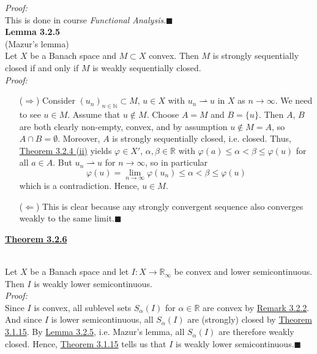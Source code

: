 \textit{Proof:}\\
This is done in course \textit{Functional Analysis}.\hfill$\blacksquare$\\[11pt]

\hypertarget{lemma_3_2_5}{\textbf{Lemma 3.2.5}}\\
(Mazur's lemma)\\
Let $X$ be a Banach space and $M\subset X$ convex. Then $M$ is strongly sequentially closed if and only if $M$ is weakly sequentially closed.\\

\textit{Proof:}
\begin{itemize}
	\item[($\Rightarrow$)] Consider $(u_n)_{n\in\mathbb{N}}\subset M$, $u\in X$ with $u_n\rightharpoonup u$ in $X$ as $n\to\infty$. We need to see $u\in M$. Assume that $u\notin M$. Choose $A=M$ and $B=\{u\}$. Then $A$, $B$ are both clearly non-empty, convex, and by assumption $u\notin M=A$, so $A\cap B=\emptyset$. Moreover, $A$ is strongly sequentially closed, i.e. closed. Thus, \hyperlink{theorem_3_2_4}{Theorem 3.2.4 (ii)} yields $\varphi\in X'$, $\alpha,\beta\in\mathbb{R}$ with $\varphi(a)\leq\alpha<\beta\leq\varphi(u)$ for all $a\in A$. But $u_n\rightharpoonup u$ for $n\to\infty$, so in particular
	\[\varphi(u)=\lim_{n\to\infty}{\varphi(u_n)}\leq\alpha<\beta\leq\varphi(u)\]
	which is a contradiction. Hence, $u\in M$.
	\item[($\Leftarrow$)] This is clear because any strongly convergent sequence also converges weakly to the same limit.\hfill$\blacksquare$\\[11pt]
\end{itemize}

\hypertarget{theorem_3_2_6}{\textbf{\underline{Theorem 3.2.6}}}\\
Let $X$ be a Banach space and let $I:X\longrightarrow\mathbb{R}_\infty$ be convex and lower semicontinuous. Then $I$ is weakly lower semicontinuous.\\

\textit{Proof:}\\
Since $I$ is convex, all sublevel sets $S_\alpha(I)$ for $\alpha\in\mathbb{R}$ are convex by \hyperlink{remark_3_2_2}{Remark 3.2.2}. And since $I$ is lower semicontinuous, all $S_\alpha(I)$ are (strongly) closed by \hyperlink{theorem_3_1_15}{Theorem 3.1.15}. By \hyperlink{lemma_3_2_5}{Lemma 3.2.5}, i.e. Mazur's lemma, all $S_\alpha(I)$ are therefore weakly closed. Hence, \hyperlink{theorem_3_1_15}{Theorem 3.1.15} tells us that $I$ is weakly lower semicontinuous.\hfill$\blacksquare$\\[11pt]

